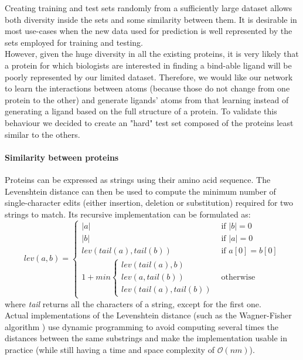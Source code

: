 \documentclass{article}
\begin{document}
Creating training and test sets randomly from a sufficiently large dataset allows both diversity inside the sets and some similarity between them. It is desirable in most use-cases when the new data used for prediction is well represented by the sets employed for training and testing. \\
However, given the huge diversity in all the existing proteins, it is very likely that a protein for which biologists are interested in finding a bind-able ligand will be poorly represented by our limited dataset. Therefore, we would like our network to learn the interactions between atoms (because those do not change from one protein to the other) and generate ligands' atoms from that learning instead of generating a ligand based on the full structure of a protein. To validate this behaviour we decided to create an "hard" test set composed of the proteins least similar to the others.

\paragraph{Similarity between proteins}
Proteins can be expressed as strings using their amino acid sequence. The Levenshtein distance can then be used to compute the minimum number of single-character edits (either insertion, deletion or substitution) required for two strings to match. Its recursive implementation can be formulated as:
$$
lev(a, b) = \left\{
    \begin{array}{ll}
        \vert a \vert & \mbox{if } \vert b \vert = 0 \\
        \vert b \vert & \mbox{if } \vert a \vert = 0 \\
        lev(tail(a), tail(b)) & \mbox{if } a[0] = b[0] \\
        1 + min \left\{
            \begin{array}{ll}
                lev(tail(a), b) \\
                lev(a, tail(b)) \\
                lev(tail(a), tail(b))
            \end{array}
        \right. & \mbox{otherwise}
    \end{array}
\right.
$$
where \textit{tail} returns all the characters of a string, except for the first one. \\
Actual implementations of the Levenshtein distance (such as the Wagner-Fisher algorithm \cite{WFal}) use dynamic programming to avoid computing several times the distances between the same substrings and make the implementation usable in practice (while still having a time and space complexity of $\mathcal{O}(nm)$). \\
\end{document}
